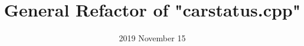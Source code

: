 \documentclass{article}
\begin{document}
\title{General Refactor of "carstatus.cpp"}
\date{2019 November 15}
\end{document}
